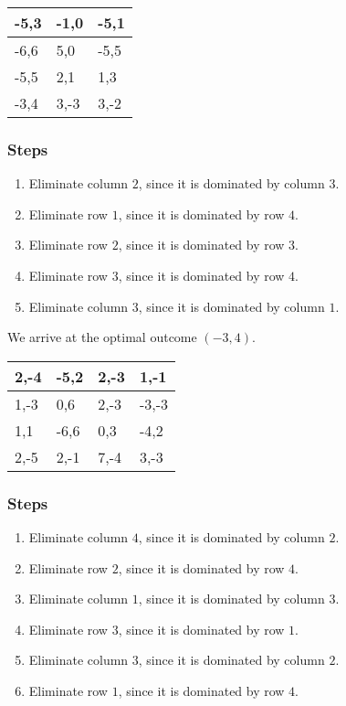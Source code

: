 \documentclass{article}
\begin{document}
\begin{table}[]
\centering
\begin{tabular}{|l|l|l|}
\hline-5,3 & -1,0 & -5,1\\ \hline
-6,6 & 5,0 & -5,5\\ \hline
-5,5 & 2,1 & 1,3\\ \hline
-3,4 & 3,-3 & 3,-2\\ \hline
\end{tabular}
\end{table}\subsubsection*{Steps}
\begin{enumerate}
\item Eliminate column $2$, since it is dominated by column $3$.
\item Eliminate row $1$, since it is dominated by row $4$.
\item Eliminate row $2$, since it is dominated by row $3$.
\item Eliminate row $3$, since it is dominated by row $4$.
\item Eliminate column $3$, since it is dominated by column $1$.
\end{enumerate}
We arrive at the optimal outcome $(-3, 4)$.
\newpage
\begin{table}[]
\centering
\begin{tabular}{|l|l|l|l|}
\hline2,-4 & -5,2 & 2,-3 & 1,-1\\ \hline
1,-3 & 0,6 & 2,-3 & -3,-3\\ \hline
1,1 & -6,6 & 0,3 & -4,2\\ \hline
2,-5 & 2,-1 & 7,-4 & 3,-3\\ \hline
\end{tabular}
\end{table}\subsubsection*{Steps}
\begin{enumerate}
\item Eliminate column $4$, since it is dominated by column $2$.
\item Eliminate row $2$, since it is dominated by row $4$.
\item Eliminate column $1$, since it is dominated by column $3$.
\item Eliminate row $3$, since it is dominated by row $1$.
\item Eliminate column $3$, since it is dominated by column $2$.
\item Eliminate row $1$, since it is dominated by row $4$.
\end{enumerate}
\end{document}

